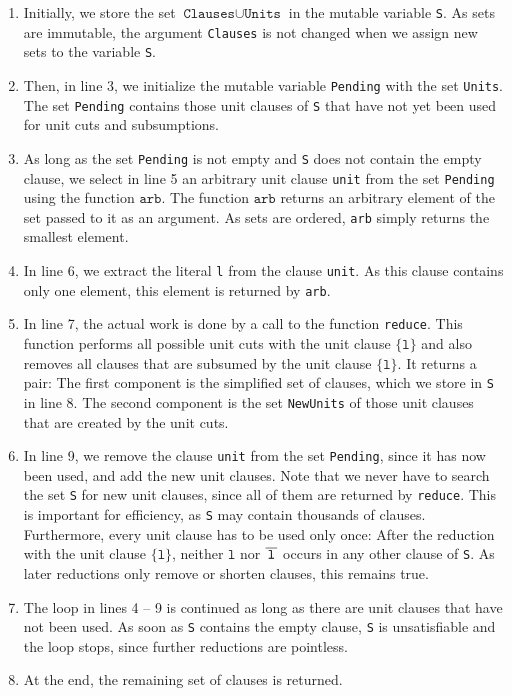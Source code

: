 \begin{enumerate}
\item Initially, we store the set $\texttt{Clauses} \cup \texttt{Units}$ in the mutable variable \texttt{S}.
      As \Fsharp{} sets are immutable, the argument \texttt{Clauses} is not changed when we assign new sets
      to the variable \texttt{S}.
\item Then, in line 3, we initialize the mutable variable \texttt{Pending} with the set \texttt{Units}.
      The set \texttt{Pending} contains those unit clauses of \texttt{S} that have not yet been used for unit cuts
      and subsumptions.
\item As long as the set \texttt{Pending} is not empty and \texttt{S} does not contain the empty clause, we
      select in line 5 an arbitrary unit clause \texttt{unit} from the set \texttt{Pending} using the function
      $\texttt{arb}$.
      The function $\texttt{arb}$ returns an arbitrary element of the set passed to it as an argument.  As
      \Fsharp{} sets are ordered, \texttt{arb} simply returns the smallest element.
\item In line 6, we extract the literal \texttt{l} from the clause
      \texttt{unit}.  As this clause contains only one element, this element is returned by \texttt{arb}.
\item In line 7, the actual work is done by a call to the function
      \texttt{reduce}. This function performs all possible unit cuts with the
      unit clause $\{\texttt{l}\}$ and also removes all clauses that
      are subsumed by the unit clause $\{\texttt{l}\}$.  It returns a pair: The first component is the
      simplified set of clauses, which we store in \texttt{S} in line 8.  The second component is the set
      \texttt{NewUnits} of those unit clauses that are created by the unit cuts.
\item In line 9, we remove the clause \texttt{unit} from the set \texttt{Pending}, since it has now been used, and
      add the new unit clauses.  Note that we never have to search the set \texttt{S} for new unit clauses, since
      all of them are returned by \texttt{reduce}.  This is important for efficiency, as \texttt{S} may contain
      thousands of clauses.  Furthermore, every unit clause has to be used only once:  After the reduction with
      the unit clause $\{\texttt{l}\}$, neither $\texttt{l}$ nor $\overline{\,\texttt{l}\,}$ occurs in any other
      clause of \texttt{S}.  As later reductions only remove or shorten clauses, this remains true.
\item The loop in lines 4 -- 9 is continued as long as there are
      unit clauses that have not been used.  As soon as \texttt{S} contains the empty clause, \texttt{S} is
      unsatisfiable and the loop stops, since further reductions are pointless.
\item At the end, the remaining set of clauses is returned.
\end{enumerate}
